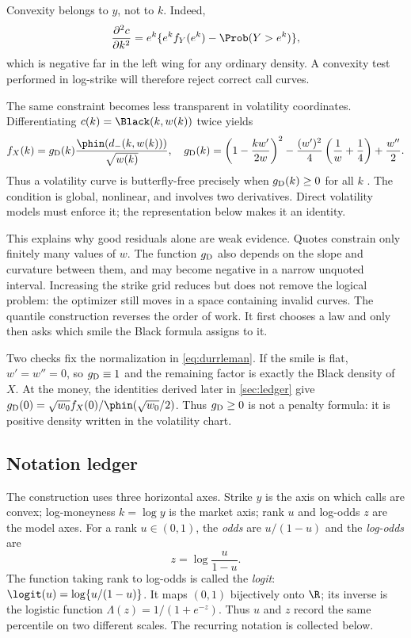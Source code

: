Convexity belongs to $y$, not to $k$.  Indeed,
\[
\frac{\partial^2c}{\partial k^2}
=e^k\{e^kf_Y(e^k)-\Prob(Y>e^k)\},
\]
which is negative far in the left wing for any ordinary density.  A convexity
test performed in log-strike will therefore reject correct call curves.

The same constraint becomes less transparent in volatility coordinates.
Differentiating $c(k)=\Black(k,w(k))$ twice yields
\begin{equation}
f_X(k)=g_{\rm D}(k)\frac{\phin(d_-(k,w(k)))}{\sqrt{w(k)}},
\quad
g_{\rm D}(k)=
\left(1-\frac{k w'}{2w}\right)^2
-\frac{(w')^2}{4}\left(\frac1w+\frac14\right)+\frac{w''}{2}.
\label{eq:durrleman}
\end{equation}
Thus a volatility curve is butterfly-free precisely when
$g_{\rm D}(k)\ge0$ for all $k$ \citep{GatheralJacquier2014}.  The condition is
global, nonlinear, and involves two derivatives.  Direct volatility models
must enforce it; the representation below makes it an identity.

This explains why good residuals alone are weak evidence.  Quotes constrain
only finitely many values of $w$.  The function $g_{\rm D}$ also depends on
the slope and curvature between them, and may become negative in a narrow
unquoted interval.  Increasing the strike grid reduces but does not remove
the logical problem: the optimizer still moves in a space containing invalid
curves.  The quantile construction reverses the order of work.  It first
chooses a law and only then asks which smile the Black formula assigns to it.

Two checks fix the normalization in \eqref{eq:durrleman}.  If the smile is
flat, $w'=w''=0$, so $g_{\rm D}\equiv1$ and the remaining factor is exactly
the Black density of $X$.  At the money, the identities derived later in
\cref{sec:ledger} give
$g_{\rm D}(0)=\sqrt{w_0}f_X(0)/\phin(\sqrt{w_0}/2)$.  Thus
$g_{\rm D}\ge0$ is not a penalty formula: it is positive density written in
the volatility chart.

\subsection{Notation ledger}

The construction uses three horizontal axes.  Strike $y$ is the axis on which
calls are convex; log-moneyness $k=\log y$ is the market axis; rank $u$ and
log-odds $z$ are the model axes.  For a rank $u\in(0,1)$, the \emph{odds} are
$u/(1-u)$ and the \emph{log-odds} are
\[
z=\log\frac{u}{1-u}.
\]
The function taking rank to log-odds is called the \emph{logit}:
$\logit(u)=\log\{u/(1-u)\}$.  It maps $(0,1)$ bijectively onto $\R$; its
inverse is the logistic function $\Lambda(z)=1/(1+e^{-z})$.  Thus $u$ and $z$
record the same percentile on two different scales.  The recurring notation
is collected below.

